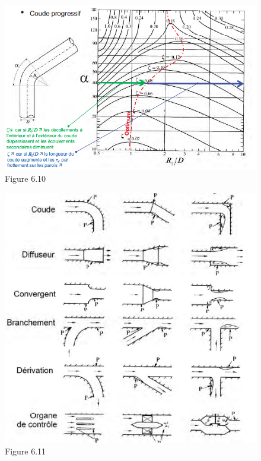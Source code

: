 \begin{minipage}{0.49\textwidth}
\begin{figure}[H]
\begin{center}
\includegraphics[scale=0.3]{ch6/83.png}
\caption*{Figure 6.10}
\end{center}
\end{figure}
\end{minipage}
\begin{minipage}{0.49\textwidth}
\begin{figure}[H]
\begin{center}
\includegraphics[scale=0.35]{ch6/84.png}
\caption*{Figure 6.11}
\end{center}
\end{figure}
\end{minipage}


